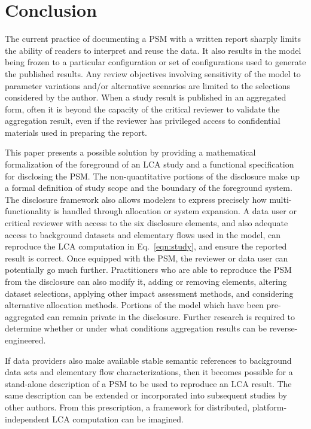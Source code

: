 \section{Conclusion} 

The current practice of documenting a PSM with a written report sharply limits the ability of readers to interpret and reuse the data.  It also results in the model being frozen to a particular configuration or set of configurations used to generate the published results.  Any review objectives involving sensitivity of the model to parameter variations and/or alternative scenarios are limited to the selections considered by the author.
When a study result is published in an aggregated form, often it is beyond the capacity of the critical reviewer to validate the aggregation result, even if the reviewer has privileged access to confidential materials used in preparing the report. 

This paper presents a possible solution by providing a mathematical formalization of the foreground of an LCA study and a functional specification for disclosing the PSM.  The non-quantitative portions of the disclosure make up a formal definition of study scope and the boundary of the foreground system.  The disclosure framework also allows modelers to express precisely how multi-functionality is handled through allocation or system expansion.  A data user or critical reviewer with access to the six disclosure elements, and also adequate access to background datasets and elementary flows used in the model, can reproduce the LCA computation in Eq.~\ref{eqn:study}, and ensure the reported result is correct.  Once equipped with the PSM, the reviewer or data user can potentially go much further.  Practitioners who are able to reproduce the PSM from the disclosure can also modify it, adding or removing elements, altering dataset selections, applying other impact assessment methods, and considering alternative allocation methods. Portions of the model which have been pre-aggregated can remain private in the disclosure. Further research is required to determine whether or under what conditions aggregation results can be reverse-engineered.

If data providers also make available stable semantic references to background data sets and elementary flow characterizations, then it becomes possible for a stand-alone description of a PSM to be used to reproduce an LCA result.  The same description can be extended or incorporated into subsequent studies by other authors. From this prescription, a framework for distributed, platform-independent LCA computation can be imagined.

